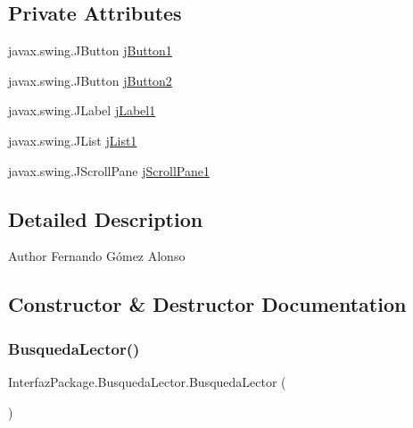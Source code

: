 \subsection*{Private Attributes}
\begin{DoxyCompactItemize}
\item 
javax.\+swing.\+J\+Button \mbox{\hyperlink{class_interfaz_package_1_1_busqueda_lector_aafddbf0bf8e006576588abc987d139da}{j\+Button1}}
\item 
javax.\+swing.\+J\+Button \mbox{\hyperlink{class_interfaz_package_1_1_busqueda_lector_a4c37aae2d858c81bf7cd2590bf39f62b}{j\+Button2}}
\item 
javax.\+swing.\+J\+Label \mbox{\hyperlink{class_interfaz_package_1_1_busqueda_lector_a449890b71a3ddf1a45b169af153b364c}{j\+Label1}}
\item 
javax.\+swing.\+J\+List \mbox{\hyperlink{class_interfaz_package_1_1_busqueda_lector_a79d4bc8896dcf47007cf4f1a138d8798}{j\+List1}}
\item 
javax.\+swing.\+J\+Scroll\+Pane \mbox{\hyperlink{class_interfaz_package_1_1_busqueda_lector_abc4a324ddee78d264865afedf117ff86}{j\+Scroll\+Pane1}}
\end{DoxyCompactItemize}


\subsection{Detailed Description}
\begin{DoxyAuthor}{Author}
Fernando Gómez Alonso 
\end{DoxyAuthor}


\subsection{Constructor \& Destructor Documentation}
\mbox{\label{class_interfaz_package_1_1_busqueda_lector_a2694b304cc19f63494b4a46e0501063d}} 
\subsubsection{\texorpdfstring{Busqueda\+Lector()}{BusquedaLector()}}
{\footnotesize\ttfamily Interfaz\+Package.\+Busqueda\+Lector.\+Busqueda\+Lector (\begin{DoxyParamCaption}{ }\end{DoxyParamCaption})\hspace{0.3cm}{\ttfamily [inline]}}

